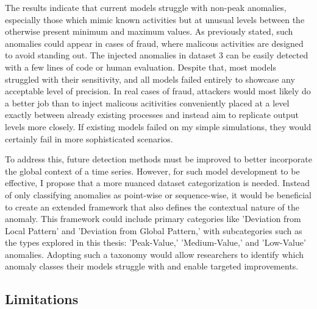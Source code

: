 \documentclass[12pt,oneside]{article}
\begin{document}
The results indicate that current models struggle with non-peak anomalies, especially those which mimic known activities but at unusual levels between the otherwise present minimum and maximum values. As previously stated, such anomalies could appear in cases of fraud, where malicous activities are designed to avoid standing out. The injected anomalies in dataset 3 can be easily detected with a few lines of code or human evaluation. Despite that, most models struggled with their sensitivity, and all models failed entirely to showcase any acceptable level of precision. In real cases of fraud, attackers would most likely do a better job than to inject malicous acitivities conveniently placed at a level exactly between already existing processes and instead aim to replicate output levels more closely. If existing models failed on my simple simulations, they would certainly fail in more sophisticated scenarios. \par
To address this, future detection methods must be improved to better incorporate the global context of a time series. However, for such model development to be effective, I propose that a more nuanced dataset categorization is needed. Instead of only classifying anomalies as point-wise or sequence-wise, it would be beneficial to create an extended framework that also defines the contextual nature of the anomaly. This framework could include primary categories like 'Deviation from Local Pattern' and 'Deviation from Global Pattern,' with subcategories such as the types explored in this thesis: 'Peak-Value,' 'Medium-Value,' and 'Low-Value' anomalies. Adopting such a taxonomy would allow researchers to identify which anomaly classes their models struggle with and enable targeted improvements.


\subsection{Limitations}
\end{document}

